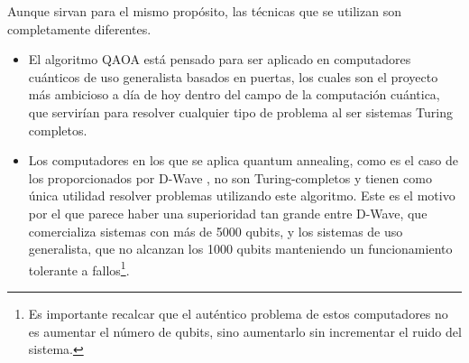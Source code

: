Aunque sirvan para el mismo propósito, las técnicas que se utilizan son completamente diferentes.
\begin{itemize}
\item El algoritmo QAOA está pensado para ser aplicado en computadores cuánticos de uso generalista basados en puertas, los cuales son el proyecto más ambicioso a día de hoy dentro del campo de la computación cuántica, que servirían para resolver cualquier tipo de problema al ser sistemas Turing completos. 
\item Los computadores en los que se aplica quantum annealing, como es el caso de los proporcionados por D-Wave%
, no son Turing-completos y tienen como única utilidad resolver problemas utilizando este algoritmo. Este es el motivo por el que parece haber una superioridad tan grande entre D-Wave, que comercializa sistemas con más de 5000 qubits, y los sistemas de uso generalista, que no alcanzan los 1000 qubits manteniendo un funcionamiento tolerante a fallos\footnote{Es importante recalcar que el auténtico problema de estos computadores no es aumentar el número de qubits, sino aumentarlo sin incrementar el ruido del sistema.}.
\end{itemize}

